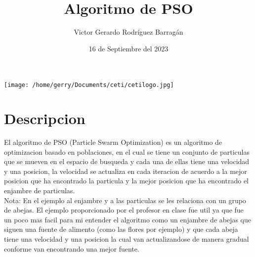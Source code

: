 \documentclass{article}
\title{Algoritmo de PSO}
\author{Victor Gerardo Rodríguez Barragán}
\date{16 de Septiembre del 2023}
\begin{document}
\maketitle
\begin{center}
    \texttt{[image: /home/gerry/Documents/ceti/cetilogo.jpg]}
\end{center}

\newpage
\justify
\section*{Descripcion}
El algoritmo de PSO (Particle Swarm Optimization) es un algoritmo de optimizacion basado en
poblaciones, en el cual se tiene un conjunto de particulas que se mueven en el espacio de busqueda
y cada una de ellas tiene una velocidad y una posicion, la velocidad se actualiza en cada iteracion
de acuerdo a la mejor posicion que ha encontrado la particula y la mejor posicion que ha encontrado
el enjambre de particulas.
\vspace{0.5cm}\\
Nota: En el ejemplo al enjambre y a las particulas se les relaciona con un grupo de abejas. El
ejemplo proporcionado por el profesor en clase fue util ya que fue un poco mas facil para mi entender
el algoritmo como un enjambre de abejas que siguen una fuente de alimento (como las flores por ejemplo)
y que cada abeja tiene una velocidad y una posicion la cual van actualizandose de manera gradual conforme
van encontrando una mejor fuente.
\end{document}

